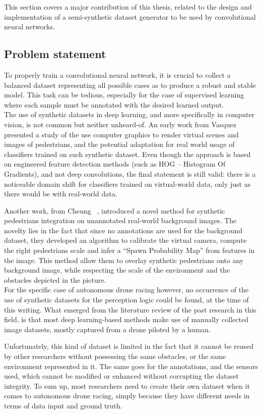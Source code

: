 This section covers a major contribution of this thesis, related to the design
and implementation of a semi-synthetic dataset generator to be used by
convolutional neural networks.

\subsection{Problem statement}

To properly train a convolutional neural network, it is crucial to collect a
balanced dataset representing all possible cases as to produce a robust and
stable model. This task can be tedious, especially for the case of supervised
learning where each sample must be annotated with the desired learned output.\\

The use of synthetic datasets in deep learning, and more specifically in
computer vision, is not common but neither unheard-of. An early work from
Vasquez \etal~\cite{PedestrianDetection} presented a study of the use computer
graphics to render virtual scenes and images of pedestrians, and the potential
adaptation for real world usage of classifiers trained on such synthetic
dataset. Even though the approach is based on engineered feature detection
methods (such as HOG -- Histogram Of Gradients), and not deep convolutions, the
final statement is still valid: there is a noticeable domain shift for
classifiers trained on virtual-world data, only just as there would be with
real-world data.

Another work, from Cheung \etal~\cite{CheungWBM17}, introduced a novel method
for synthetic pedestrians integration on unannotated real-world background
images. The novelty lies in the fact that since no annotations are used for the
background dataset, they developed an algorithm to calibrate the virtual
camera, compute the right pedestrians scale and infer a ``Spawn Probability
Map'' from features in the image. This method allow them to overlay synthetic
pedestrians onto any background image, while respecting the scale of the
environment and the obstacles depicted in the picture.\\


For the specific case of autonomous drone racing however, no occurrence of the
use of synthetic datasets for the perception logic could be found, at the time
of this writing. What emerged from the literature review of the past research
in this field, is that most deep learning-based methods make use of manually
collected image datasets, mostly captured from a drone piloted by a human.

Unfortunately, this kind of dataset is limited in the fact that it cannot be
reused by other researchers without possessing the same obstacles, or the same
environment represented in it. The same goes for the annotations, and the
sensors used, which cannot be modified or enhanced without corrupting the
dataset integrity. To sum up, most researchers need to create their own dataset
when it comes to autonomous drone racing, simply because they have different
needs in terms of data input and ground truth.\\

